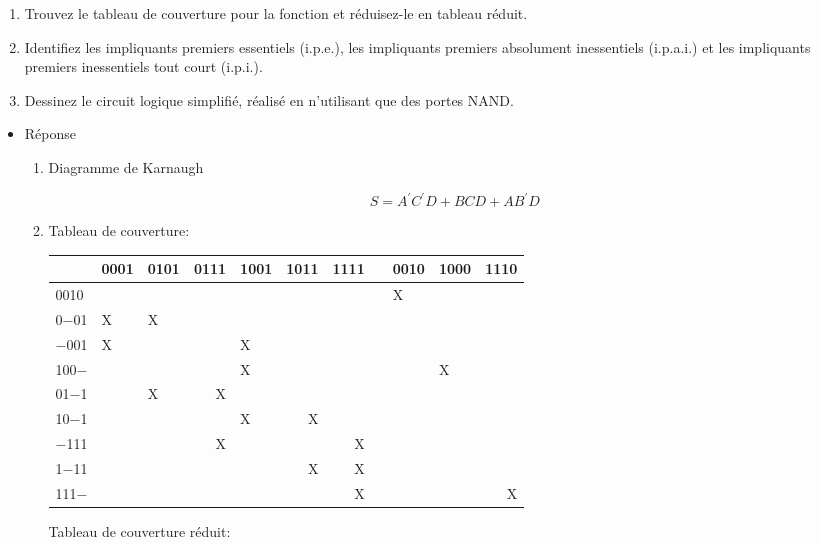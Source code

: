\documentclass[letter, oneside]{book}
\begin{document}
\begin{itemize}
\begin{enumerate}
\item Trouvez le tableau de couverture pour la fonction et réduisez-le en tableau réduit.

\item Identifiez les impliquants premiers essentiels (i.p.e.), les
impliquants premiers absolument inessentiels (i.p.a.i.) et les
impliquants premiers inessentiels tout court (i.p.i.).

\item Dessinez le circuit logique simplifié, réalisé en n'utilisant que des portes NAND.
\end{enumerate}

\begin{itemize}
\item Réponse
\label{sec:orgdc36eb2}

\begin{enumerate}
\item Diagramme de Karnaugh

\begin{center}

\end{center}
$$
  S = A^{\prime}C^{\prime}D + BCD + AB^{\prime}D
  $$

\item Tableau de couverture:

\begin{center}
\begin{tabular}{lllrlrrlllr}
 & 0001 & 0101 & 0111 & 1001 & 1011 & 1111 &  & 0010 & 1000 & 1110\\[0pt]
\hline
0010 &  &  &  &  &  &  &  & X &  & \\[0pt]
0−01 & X & X &  &  &  &  &  &  &  & \\[0pt]
−001 & X &  &  & X &  &  &  &  &  & \\[0pt]
100− &  &  &  & X &  &  &  &  & X & \\[0pt]
01−1 &  & X & X &  &  &  &  &  &  & \\[0pt]
10−1 &  &  &  & X & X &  &  &  &  & \\[0pt]
−111 &  &  & X &  &  & X &  &  &  & \\[0pt]
1−11 &  &  &  &  & X & X &  &  &  & \\[0pt]
111− &  &  &  &  &  & X &  &  &  & X\\[0pt]
\end{tabular}
\end{center}

Tableau de couverture réduit:


\end{enumerate}
\end{itemize}
\end{itemize}
\end{document}
